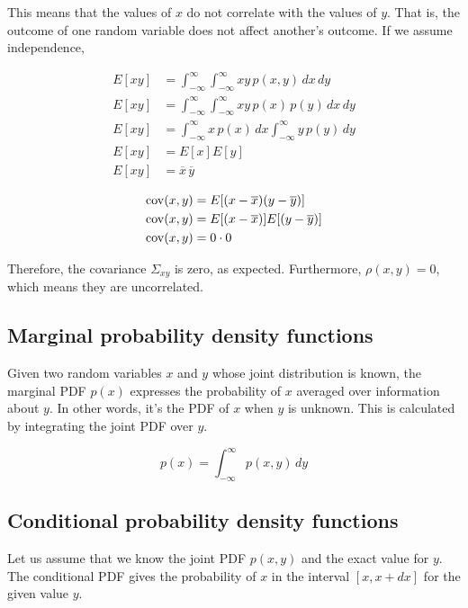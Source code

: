 This means that the values of $x$ do not correlate with the values of $y$. That
is, the outcome of one random variable does not affect another's outcome. If we
assume independence,

\begin{align*}
  E[xy] &= \int_{-\infty}^\infty \int_{-\infty}^\infty xy \,p(x, y) \,dx \,dy \\
  E[xy] &= \int_{-\infty}^\infty \int_{-\infty}^\infty xy \,p(x) \,p(y) \,dx
    \,dy \\
  E[xy] &= \int_{-\infty}^\infty x \,p(x) \,dx \int_{-\infty}^\infty y \,p(y)
    \,dy \\
  E[xy] &= E[x]E[y] \\
  E[xy] &= \overline{x}\,\overline{y}
\end{align*}

\begin{align*}
  \operatorname{cov}(x, y) &= E[(x - \overline{x})(y - \overline{y})] \\
  \operatorname{cov}(x, y) &= E[(x - \overline{x})]E[(y - \overline{y})] \\
  \operatorname{cov}(x, y) &= 0 \cdot 0 \\
\end{align*}

Therefore, the covariance $\Sigma_{xy}$ is zero, as expected. Furthermore,
$\rho(x, y) = 0$, which means they are uncorrelated.

\subsection{Marginal probability density functions}

Given two random variables $x$ and $y$ whose joint distribution is known, the
marginal PDF $p(x)$ expresses the probability of $x$ averaged over information
about $y$. In other words, it's the PDF of $x$ when $y$ is unknown. This is
calculated by integrating the joint PDF over $y$.

\begin{equation*}
  p(x) = \int_{-\infty}^\infty p(x, y) \,dy
\end{equation*}

\subsection{Conditional probability density functions}

Let us assume that we know the joint PDF $p(x, y)$ and the exact value for $y$.
The conditional PDF gives the probability of $x$ in the interval $[x, x + dx]$
for the given value $y$.

